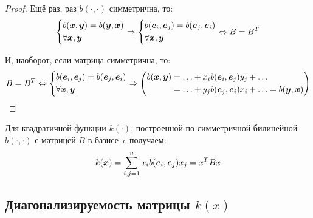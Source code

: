 \documentclass[a4paper,12pt]{article}
\begin{document}
  \begin{proof}
    Ещё раз, раз $b(\cdot, \cdot)$ симметрична, то:
    \[
      \left\{
        \begin{aligned}
          &b(\boldsymbol x, \boldsymbol y) = b(\boldsymbol y, \boldsymbol x)\\
          &\forall \boldsymbol x, \boldsymbol y
        \end{aligned}
      \right. \Rightarrow \left\{
        \begin{aligned}
          &b(\boldsymbol e_i, \boldsymbol e_j) = b(\boldsymbol e_j, \boldsymbol e_i)\\
          &\forall \boldsymbol x, \boldsymbol y
        \end{aligned}
      \right.
      \Leftrightarrow B = B^T
    \]
    
    И, наоборот, если матрица симметрична, то:
    \[
      B = B^T \Leftrightarrow \left\{
        \begin{aligned}
          &b(\bds e_i, \bds e_j) = b(\bds e_j, \bds e_i)\\
          &\forall \bds x, \bds y
        \end{aligned}
      \right. \Rightarrow %
        \left(
          \begin{aligned}
            b(\bds x, \bds y) &= \ldots + x_i b(\bds e_i, \bds e_j) y_j + \ldots\\
                              &= \ldots + y_j b(\bds e_j, \bds e_i) x_i + \ldots = b(\bds y, \bds x)
          \end{aligned}
        \right)
    \]
  \end{proof}
  
  Для квадратичной функции $k(\cdot)$, построенной по симметричной билинейной $b(\cdot, \cdot)$ с матрицей $B$ в базисе~$e$ получаем:
  \[
    k(\boldsymbol x) = \sum_{i, j = 1}^{n} x_i b(\boldsymbol e_i, \boldsymbol e_j) x_j = x^T B x
  \]
  
  
  \subsection{Диагонализируемость матрицы $k(x)$}
  
\end{document}
